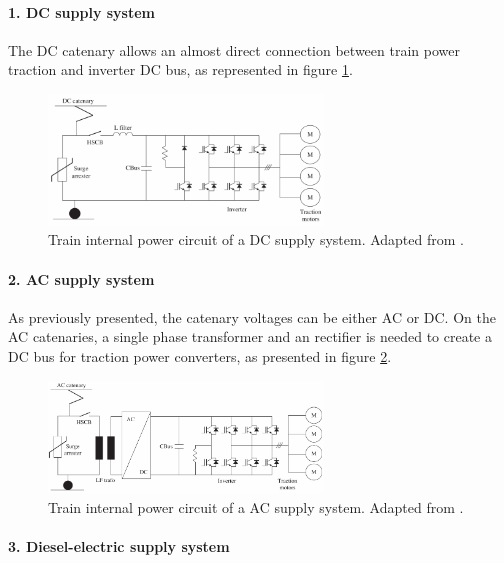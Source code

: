 \paragraph{1. DC supply system\\}


The DC catenary allows an almost direct connection between train power traction and inverter DC bus, as represented in figure \ref{fig:abad2016c}.

\begin{figure}[h!]
	\centering
	\includegraphics[width=0.65\textwidth,keepaspectratio]{figures/31.PowerS/abad2016c}
	\caption{Train internal power circuit of a DC supply system. Adapted from \cite{abad2016}.}
	\label{fig:abad2016c}
\end{figure}

\paragraph{2. AC supply system\\}

As previously presented, the catenary voltages can be either AC or DC. On the AC catenaries, a single phase transformer and an rectifier is needed to create a DC bus for traction power converters, as presented in figure \ref{fig:abad2016g}.


\begin{figure}[h!]
	\centering
	\includegraphics[width=0.65\textwidth,keepaspectratio]{figures/31.PowerS/abad2016g}
	\caption{Train internal power circuit of a AC supply system. Adapted from \cite{abad2016}.}
	\label{fig:abad2016g}
\end{figure}

\paragraph{3. Diesel-electric supply system\\}

